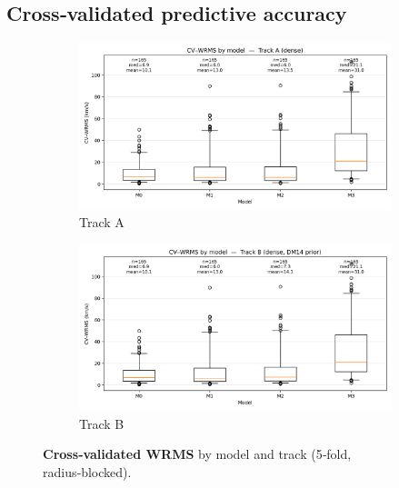 \documentclass[12pt]{article}
\begin{document}
\subsection*{Cross‑validated predictive accuracy}
\begin{figure}[H]
  \centering
  \begin{subfigure}{0.48\linewidth}
    \centering\includegraphics[width=\linewidth]{figs_trackA_dense/cv_wrms_boxplot.png}
    \caption{Track A}
  \end{subfigure}\hfill
  \begin{subfigure}{0.48\linewidth}
    \centering\includegraphics[width=\linewidth]{figs_trackB_dense/cv_wrms_boxplot.png}
    \caption{Track B}
  \end{subfigure}
  \caption{\textbf{Cross‑validated WRMS} by model and track (5‑fold, radius‑blocked).}
  \label{fig:cvbox}
\end{figure}
\end{document}

